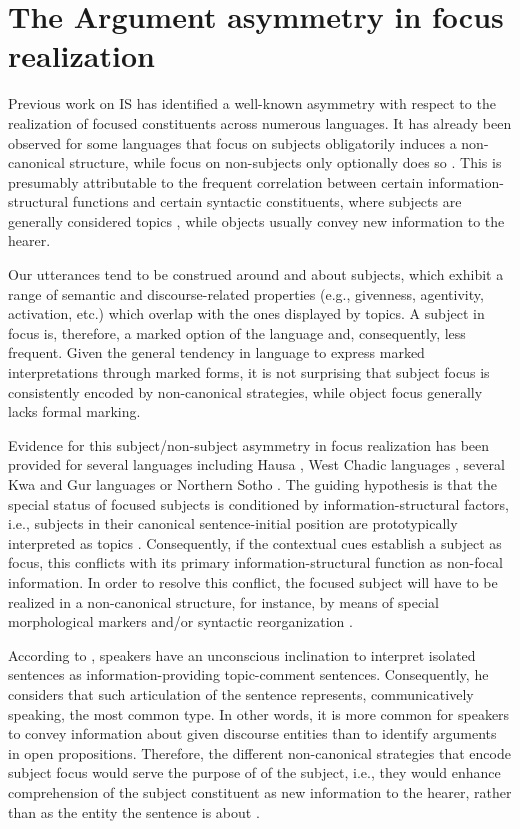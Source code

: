 \section{The Argument asymmetry in focus realization}

Previous work on IS has identified a well-known asymmetry with respect to the realization of focused constituents across numerous languages. 
It has already been observed for some languages that focus on subjects obligatorily induces a non-canonical structure, while focus on non-subjects only optionally does so \parencite{skopeteas2010focus}. This is presumably attributable to the frequent correlation between certain information-structural functions and certain syntactic constituents, where subjects are generally considered topics , while objects usually convey new information to the hearer.

Our utterances tend to be construed around and about subjects, which exhibit a range of semantic and discourse-related properties (e.g., givenness, agentivity, activation, etc.) which overlap with the ones displayed by topics. A subject in focus is, therefore, a marked option of the language and, consequently, less frequent. Given the general tendency in language to express marked interpretations through marked forms, it is not surprising that subject focus is consistently encoded by non-canonical strategies, while object focus generally lacks formal marking.

 Evidence for this subject/non-subject asymmetry in focus realization has been provided for several languages including Hausa \parencite{hartmann2007place}, West Chadic languages \parencite{zimmermann2011focus}, several Kwa and Gur languages \parencite{fiedler2005out} or Northern Sotho \parencite{zerbian2007investigating}.
The guiding hypothesis is that the special status of focused subjects is conditioned by information-structural factors, i.e., subjects in their canonical sentence-initial position are prototypically interpreted as topics \parencite{thompson1976subject}. Consequently, if the contextual cues establish a subject as focus, this conflicts with its primary information-structural function as non-focal information. In order to resolve this conflict, the focused subject will have to be realized in a non-canonical structure, for instance, by means of special morphological markers and/or syntactic reorganization \parencite{fiedler2006subject}. 

According to \textcite{lambrecht2010constraints}, speakers have an unconscious inclination to interpret isolated sentences as information-providing topic-comment sentences. Consequently, he considers that such articulation of the sentence represents, communicatively speaking, the most common type. In other words, it is more common for speakers to convey information about given discourse entities than to identify arguments in open propositions. Therefore, the different non-canonical strategies that encode subject focus would serve the purpose of  of the subject, i.e., they would enhance comprehension of the subject constituent as new information to the hearer, rather than as the entity the sentence is about \parencite{reinhart1981pragmatics}.

